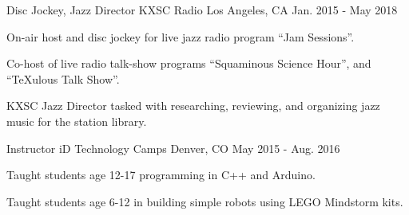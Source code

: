 \begin{cventries}
  \cventry
    {Disc Jockey, Jazz Director} %
    {KXSC Radio} %
    {Los Angeles, CA} %
    {Jan. 2015 - May 2018} %
    {
      \begin{cvitems} %
        \item {On-air host and disc jockey for live jazz radio program ``Jam Sessions''.}
        \item {Co-host of live radio talk-show programs ``Squaminous Science Hour'', and ``TeXulous Talk Show''.}
        \item {KXSC Jazz Director tasked with researching, reviewing, and organizing jazz music for the station library.}
      \end{cvitems}
    }
    \cventry
    {Instructor} %
    {iD Technology Camps} %
    {Denver, CO} %
    {May 2015 - Aug. 2016} %
    {
      \begin{cvitems} %
        \item {Taught students age 12-17 programming in C++ and Arduino.}
        \item {Taught students age 6-12 in building simple robots using LEGO Mindstorm kits.}
      \end{cvitems}
    }

\end{cventries}
